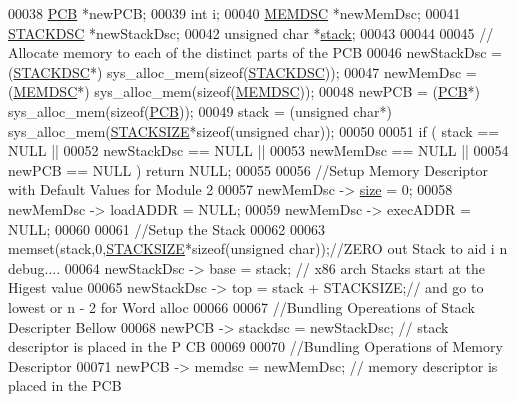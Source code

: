 \begin{DoxyCode}
00038         \hyperlink{structprocess}{PCB} *newPCB; 
00039         \textcolor{keywordtype}{int} i; 
00040         \hyperlink{structmem}{MEMDSC} *newMemDsc;
00041         \hyperlink{structstack}{STACKDSC} *newStackDsc;
00042         \textcolor{keywordtype}{unsigned} \textcolor{keywordtype}{char} *\hyperlink{structstack}{stack}; 
00043         
00044         
00045         \textcolor{comment}{// Allocate memory to each of the distinct parts of the PCB}
00046         newStackDsc = (\hyperlink{structstack}{STACKDSC}*) sys\_alloc\_mem(\textcolor{keyword}{sizeof}(\hyperlink{structstack}{STACKDSC}));
00047         newMemDsc = (\hyperlink{structmem}{MEMDSC}*) sys\_alloc\_mem(\textcolor{keyword}{sizeof}(\hyperlink{structmem}{MEMDSC}));
00048         newPCB = (\hyperlink{structprocess}{PCB}*) sys\_alloc\_mem(\textcolor{keyword}{sizeof}(\hyperlink{structprocess}{PCB}));
00049         stack = (\textcolor{keywordtype}{unsigned} \textcolor{keywordtype}{char}*) sys\_alloc\_mem(\hyperlink{mpx__r2_8h_a21d9543c516fffee84a7963224271f95}{STACKSIZE}*\textcolor{keyword}{sizeof}(\textcolor{keywordtype}{unsigned} \textcolor{keywordtype}{char}));
00050         
00051         \textcolor{keywordflow}{if} ( stack == NULL ||
00052                  newStackDsc == NULL || 
00053                  newMemDsc == NULL ||
00054                  newPCB == NULL ) \textcolor{keywordflow}{return} NULL; 
00055         
00056         \textcolor{comment}{//Setup Memory Descriptor with Default Values for Module 2}
00057         newMemDsc -> \hyperlink{_m_p_x___r5_8h_aa23c661441688350614bd6a350d2b6ff}{size} = 0;
00058         newMemDsc -> loadADDR = NULL;
00059         newMemDsc -> execADDR = NULL;
00060         
00061         \textcolor{comment}{//Setup the Stack}
00062 
00063         memset(stack,0,\hyperlink{mpx__r2_8h_a21d9543c516fffee84a7963224271f95}{STACKSIZE}*\textcolor{keyword}{sizeof}(\textcolor{keywordtype}{unsigned} \textcolor{keywordtype}{char}));\textcolor{comment}{//ZERO out Stack to aid i
      n debug....}
00064         newStackDsc -> base = stack; \textcolor{comment}{// x86 arch Stacks start at the Higest value
      }
00065         newStackDsc -> top  = stack + STACKSIZE;\textcolor{comment}{// and go to lowest or n - 2 for 
      Word alloc}
00066         
00067         \textcolor{comment}{//Bundling Opereations of Stack Descripter Bellow}
00068         newPCB -> stackdsc = newStackDsc;  \textcolor{comment}{// stack descriptor is placed in the P
      CB}
00069         
00070         \textcolor{comment}{//Bundling Operations of Memory Descriptor }
00071         newPCB -> memdsc = newMemDsc; \textcolor{comment}{// memory descriptor is placed in the PCB}

\end{DoxyCode}
